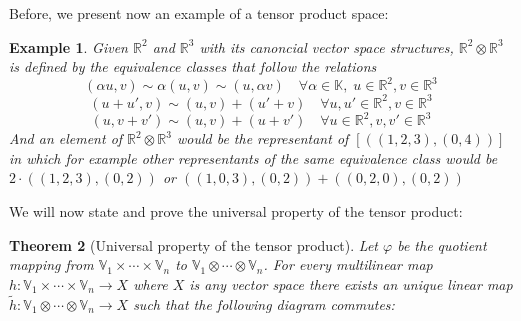 \documentclass[11pt,a4paper,openright,oneside]{book}
\numberwithin{equation}{section}
\newtheorem{defn0}{Definition}[chapter]
\newtheorem{thm0}[defn0]{Theorem}
\newtheorem{example0}[defn0]{Example}
\newenvironment{definition}{ \begin{defn0}}{\end{defn0}}
\newenvironment{theorem}{\bigskip \begin{thm0}}{\end{thm0}}
\newenvironment{example}{ \begin{example0}\rm}{\end{example0}}
\begin{document}
Before, we present now an example of a tensor product space:

\begin{example}
    Given $\mathbb{R}^2$ and $\mathbb{R}^3$ with its canoncial vector space
    structures, $\mathbb{R}^2 \otimes \mathbb{R}^3$ is defined by the equivalence classes that follow the relations
    $$(\alpha u, v) \sim \alpha (u, v) \sim (u, \alpha v) \quad \forall \alpha \in \mathbb{K}, \; u \in \mathbb{R}^2, v \in \mathbb{R}^3$$
    $$(u + u', v) \sim (u, v) + (u' + v) \quad \forall u, u' \in \mathbb{R}^2, v \in \mathbb{R}^3$$
    $$(u, v + v') \sim (u, v) + (u + v') \quad \forall u \in \mathbb{R}^2, v, v' \in \mathbb{R}^3$$
    And an element of $\mathbb{R}^2 \otimes \mathbb{R}^3$ would be the representant of $[((1, 2, 3), (0, 4))]$ in which
    for example other representants of the same equivalence class would be $2 \cdot ((1,2,3), (0, 2))$ or ${((1, 0, 3), (0, 2)) + ((0,2,0), (0, 2))}$
\end{example}
We will now state and prove the universal property of the tensor product:
\begin{theorem}[Universal property of the tensor product]
    Let $\varphi$ be the quotient mapping from $\mathbb{V}_1 \times \cdots \times \mathbb{V}_n$ to $\mathbb{V}_1 \otimes \cdots \otimes \mathbb{V}_n$. 
    For every multilinear map $h: \mathbb{V}_1 \times \cdots \times \mathbb{V}_n \rightarrow X$ where $X$ is any vector space there exists an unique linear map 
    $\tilde{h}: \mathbb{V}_1 \otimes \cdots \otimes \mathbb{V}_n \rightarrow X$ such that the following diagram commutes:

    \centering

\end{theorem}
\end{document}
